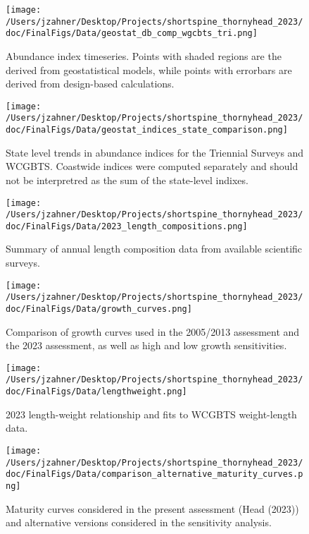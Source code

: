 \documentclass[11pt,
  english,
  letterpaper,
]{article}
\begin{document}
\begin{figure}
\centering
\texttt{[image: /Users/jzahner/Desktop/Projects/shortspine\_thornyhead\_2023/doc/FinalFigs/Data/geostat\_db\_comp\_wgcbts\_tri.png]}
\caption{Abundance index timeseries. Points with shaded regions are the derived from geostatistical models, while points with errorbars are derived from design-based calculations.\label{fig:modelbasedsurv}}
\end{figure}

\begin{figure}
\centering
\texttt{[image: /Users/jzahner/Desktop/Projects/shortspine\_thornyhead\_2023/doc/FinalFigs/Data/geostat\_indices\_state\_comparison.png]}
\caption{State level trends in abundance indices for the Triennial Surveys and WCGBTS. Coastwide indices were computed separately and should not be interpretred as the sum of the state-level indixes.\label{fig:state_indices}}
\end{figure}

\begin{figure}
\centering
\texttt{[image: /Users/jzahner/Desktop/Projects/shortspine\_thornyhead\_2023/doc/FinalFigs/Data/2023\_length\_compositions.png]}
\caption{Summary of annual length composition data from available scientific surveys.\label{fig:survey_comps}}
\end{figure}

\begin{figure}
\centering
\texttt{[image: /Users/jzahner/Desktop/Projects/shortspine\_thornyhead\_2023/doc/FinalFigs/Data/growth\_curves.png]}
\caption{Comparison of growth curves used in the 2005/2013 assessment and the 2023 assessment, as well as high and low growth sensitivities.\label{fig:growthcurve}}
\end{figure}

\begin{figure}
\centering
\texttt{[image: /Users/jzahner/Desktop/Projects/shortspine\_thornyhead\_2023/doc/FinalFigs/Data/lengthweight.png]}
\caption{2023 length-weight relationship and fits to WCGBTS weight-length data.\label{fig:lengthweight}}
\end{figure}

\begin{figure}
\centering
\texttt{[image: /Users/jzahner/Desktop/Projects/shortspine\_thornyhead\_2023/doc/FinalFigs/Data/comparison\_alternative\_maturity\_curves.png]}
\caption{Maturity curves considered in the present assessment (Head (2023)) and alternative versions considered in the sensitivity analysis.\label{fig:mat2}}
\end{figure}
\end{document}
